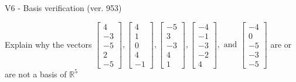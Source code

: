 \begin{exercise}
  \begin{exerciseTitle}V6 - Basis verification (ver. 953)\end{exerciseTitle}
  \begin{exerciseStatement}
    Explain why the vectors \(\left[\begin{array}{r}
4 \\
-3 \\
-5 \\
2 \\
-5
\end{array}\right] , \left[\begin{array}{r}
4 \\
1 \\
0 \\
4 \\
-1
\end{array}\right] , \left[\begin{array}{r}
-5 \\
3 \\
-3 \\
4 \\
1
\end{array}\right] , \left[\begin{array}{r}
-4 \\
-1 \\
-3 \\
-2 \\
4
\end{array}\right] , \text{ and } \left[\begin{array}{r}
-4 \\
0 \\
-5 \\
-3 \\
-5
\end{array}\right]\) are or are not a basis of \(\mathbb{R}^5\)	



\end{exerciseStatement}
\end{exercise}
